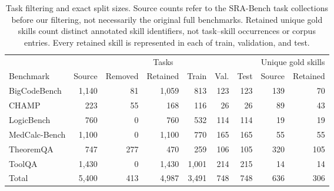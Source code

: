 \begin{table}[t]
\centering
\small
\begin{tabular*}{\textwidth}{@{\extracolsep{\fill}}lrrrrrrrr@{}}
\toprule
& \multicolumn{6}{c}{Tasks} & \multicolumn{2}{c}{Unique gold skills} \\
\cmidrule(lr){2-7}\cmidrule(lr){8-9}
Benchmark & Source & Removed & Retained & Train & Val. & Test & Source & Retained \\
\midrule
BigCodeBench & 1,140 & 81 & 1,059 & 813 & 123 & 123 & 139 & 70 \\
CHAMP & 223 & 55 & 168 & 116 & 26 & 26 & 89 & 43 \\
LogicBench & 760 & 0 & 760 & 532 & 114 & 114 & 19 & 19 \\
MedCalc-Bench & 1,100 & 0 & 1,100 & 770 & 165 & 165 & 55 & 55 \\
TheoremQA & 747 & 277 & 470 & 259 & 106 & 105 & 320 & 105 \\
ToolQA & 1,430 & 0 & 1,430 & 1,001 & 214 & 215 & 14 & 14 \\
\midrule
Total & 5,400 & 413 & 4,987 & 3,491 & 748 & 748 & 636 & 306 \\
\bottomrule
\end{tabular*}
\caption{Task filtering and exact split sizes. Source counts refer to the SRA-Bench task collections before our filtering, not necessarily the original full benchmarks. Retained unique gold skills count distinct annotated skill identifiers, not task--skill occurrences or corpus entries. Every retained skill is represented in each of train, validation, and test.}
\label{tab:appendix-data-splits}
\end{table}
